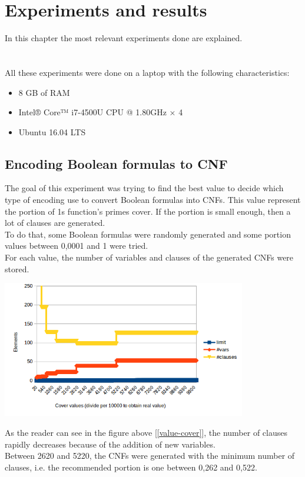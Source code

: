 
\chapter{Experiments and results} %

\label{Chapter9} %

In this chapter the most relevant experiments done are explained.\\\\\\
All these experiments were done on a laptop with the following characteristics:
\begin{itemize}
	\item 8 GB of RAM
	\item Intel® Core™ i7-4500U CPU @ 1.80GHz × 4 
	\item Ubuntu 16.04 LTS
\end{itemize}

\section{Encoding Boolean formulas to CNF}

The goal of this experiment was trying to find the best value to decide which type of encoding use to convert Boolean formulas into CNFs. This value represent the portion of 1s function's primes cover. If the portion is small enough, then a lot of clauses are generated.\\
To do that, some Boolean formulas were randomly generated and some portion values between 0,0001 and 1 were tried.\\
For each value, the number of variables and clauses of the generated CNFs were stored.

\begin{center}
	\includegraphics[width=0.8\textwidth]{Figures/value-cover.png}
	\label{value-cover}
\end{center}
As the reader can see in the figure above [\ref{value-cover}], the number of clauses rapidly decreases because of the addition of new variables.\\
Between 2620 and 5220, the CNFs were generated with the minimum number of clauses, i.e. the recommended portion is one between 0,262 and 0,522.

